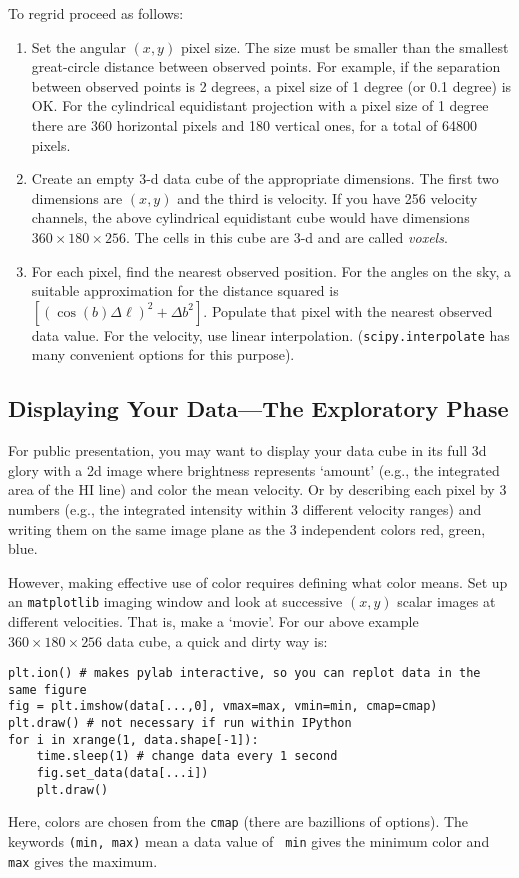 \documentclass[psfig,preprint]{aastex}
\begin{document}
To regrid proceed as
follows: \begin{enumerate}

\item Set the angular $(x,y)$ pixel size. The size must be smaller than
  the smallest great-circle distance between observed points. For
  example, if the separation between observed points is 2 degrees, a
  pixel size of 1 degree (or 0.1 degree) is OK. For the cylindrical
  equidistant projection with a pixel size of 1 degree there are 360
  horizontal pixels and 180 vertical ones, for a total of 64800 pixels.

\item Create an empty 3-d data cube of the appropriate dimensions. The
  first two dimensions are $(x,y)$ and the third is velocity. If you
  have 256 velocity channels, the above cylindrical equidistant cube
  would have dimensions $360 \times 180 \times 256$. The cells in this
  cube are 3-d and are called {\it voxels}.

\item For each pixel, find the nearest observed position. For the angles
  on the sky, a suitable approximation for the distance squared is $[
    (\cos (b) \Delta \ell)^2 + \Delta b^2]$. Populate that pixel with
  the nearest observed data value. For the velocity, use linear
  interpolation.  ({\tt scipy.interpolate} has many convenient options for
  this purpose).

\end{enumerate}

\subsection{Displaying Your Data---The Exploratory Phase}

For public presentation, you may want to display your data cube in its
full 3d glory with a 2d image where brightness represents `amount'
(e.g., the integrated area of the HI line) and color the mean
velocity. Or by describing each pixel by 3 numbers (e.g., the integrated
intensity within 3 different velocity ranges) and writing them on the
same image plane as the 3 independent colors red, green, blue.

However, making effective use of color requires defining what color
means.  Set up
an {\tt matplotlib} imaging window and look at successive $(x,y)$ scalar images at
different velocities. That is, make a `movie'. For our above example
$360 \times 180 \times 256$ data cube, a quick and dirty way
is: 

\begin{verbatim}
plt.ion() # makes pylab interactive, so you can replot data in the same figure
fig = plt.imshow(data[...,0], vmax=max, vmin=min, cmap=cmap)
plt.draw() # not necessary if run within IPython
for i in xrange(1, data.shape[-1]):
    time.sleep(1) # change data every 1 second
    fig.set_data(data[...i])
    plt.draw()
\end{verbatim}

Here, colors are chosen from the {\tt cmap} (there are bazillions of options).
The keywords {\tt (min, max)} mean a data value of {\tt
  min} gives the minimum color and {\tt max} gives the maximum.
\end{document}
